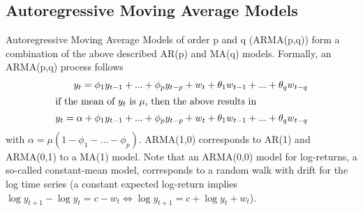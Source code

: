 \subsection{Autoregressive Moving Average Models}
Autoregressive Moving Average Models of order p and q (ARMA(p,q)) form a combination of the above described AR(p) and MA(q) models. Formally, an ARMA(p,q) process follows
\begin{align}
    y_t = \phi_1 y_{t-1} + ... + \phi_p y_{t-p} + w_t + \theta_1 w_{t-1} + ... + \theta_q w_{t-q} \\
    \intertext{if the mean of $y_t$ is $\mu$, then the above results in}
    y_t = \alpha + \phi_1 y_{t-1} + ... + \phi_p y_{t-p} + w_t + \theta_1 w_{t-1} + ... + \theta_q w_{t-q}
\end{align}
with $\alpha = \mu (1 - \phi_1 - ... - \phi_p)$. ARMA(1,0) corresponds to AR(1) and ARMA(0,1) to a MA(1) model. Note that an ARMA(0,0) model for log-returns, a so-called constant-mean model, corresponds to a random walk with drift for the log time series (a constant expected log-return implies $\log{y_{t+1}} - \log{y_t} = c - w_t \Leftrightarrow \log{y_{t+1}} = c + \log{y_t} + w_t$). 


